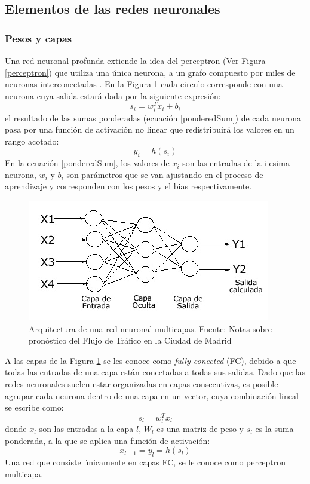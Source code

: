 \subsection{Elementos de las redes neuronales}
\subsubsection{Pesos y capas}
Una red neuronal profunda extiende la idea del perceptron (Ver Figura \ref{perceptron}) que utiliza una única neurona, a un grafo compuesto por miles de neuronas interconectadas \cite[p~270]{Szeliski2022}. En la Figura \ref{NeuralNetworkArq} cada circulo corresponde con una neurona cuya salida estará dada por la siguiente expresión:
\begin{equation}
    s_{i} = w_{i}^{T} x_{i} + b_{i} \label{ponderedSum}
\end{equation}
el resultado de las sumas ponderadas (ecuación \eqref{ponderedSum}) de cada neurona pasa por una función de activación no linear que redistribuirá los valores en un rango acotado:
\begin{equation}
    y_{i} = h(s_{i})
\end{equation}
En la ecuación \eqref{ponderedSum}, los valores de $x_{i}$ son las entradas de la i-esima neurona, $w_{i}$ y $b_{i}$ son parámetros que se van ajustando en el proceso de aprendizaje y corresponden con los pesos y el bias respectivamente. 
\begin{figure}[H]
    \centering
    \includegraphics{Recursos/NeuralNetwork.jpg}
    \caption[Arquitectura de una red neuronal multicapas.]{Arquitectura de una red neuronal multicapas. {\footnotesize Fuente: Notas sobre pronóstico del Flujo de Tráfico en la Ciudad de Madrid \cite{mañas}}}
    \label{NeuralNetworkArq}
\end{figure}
A las capas de la Figura \ref{NeuralNetworkArq} se les conoce como \textit{fully conected} (FC), debido a que todas las entradas de una capa están conectadas a todas sus salidas. Dado que las redes neuronales suelen estar organizadas en capas consecutivas, es posible agrupar cada neurona dentro de una capa en un vector, cuya combinación lineal se escribe como:
\begin{equation}
    s_{l} = w_{l}^{T} x_{l}
\end{equation}
donde $x_{l}$ son las entradas a la capa $l$, $W_{l}$ es una matriz de peso y $s_{l}$ es la suma ponderada, a la que se aplica una función de activación:
\begin{equation}
    x_{l+1} = y_{l} = h(s_{l})
\end{equation}
Una red que consiste únicamente en capas FC, se le conoce como perceptron multicapa. 
